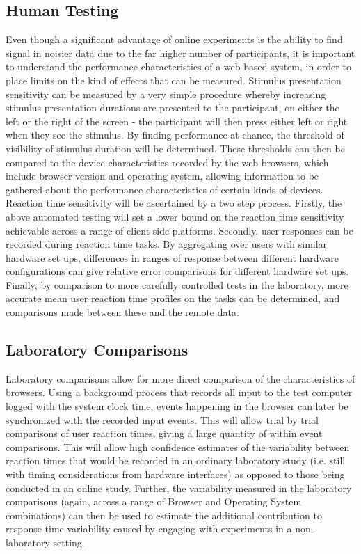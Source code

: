 \documentclass[12pt,a4paper,titlepage]{scrreprt}
\begin{document}
\subsection{Human Testing}
Even though a significant advantage of online experiments is the ability to find signal in noisier data due to the far higher number of participants\cite{birnbaum_web-based_2001}, it is important to understand the performance characteristics of a web based system, in order to place limits on the kind of effects that can be measured. 
Stimulus presentation sensitivity can be measured by a very simple procedure whereby increasing stimulus presentation durations are presented to the participant, on either the left or the right of the screen - the participant will then press either left or right when they see the stimulus. By finding performance at chance, the threshold of visibility of stimulus duration will be determined. These thresholds can then be compared to the device characteristics recorded by the web browsers, which include browser version and operating system, allowing information to be gathered about the performance characteristics of certain kinds of devices.
Reaction time sensitivity will be ascertained by a two step process. Firstly, the above automated testing will set a lower bound on the reaction time sensitivity achievable across a range of client side platforms. Secondly, user responses can be recorded during reaction time tasks. By aggregating over users with similar hardware set ups, differences in ranges of response between different hardware configurations can give relative error comparisons for different hardware set ups. Finally, by comparison to more carefully controlled tests in the laboratory, more accurate mean user reaction time profiles on the tasks can be determined, and comparisons made between these and the remote data.
\subsection{Laboratory Comparisons}
Laboratory comparisons allow for more direct comparison of the characteristics of browsers. Using a background process that records all input to the test computer logged with the system clock time, events happening in the browser can later be synchronized with the recorded input events. This will allow trial by trial comparisons of user reaction times, giving a large quantity of within event comparisons. This will allow high confidence estimates of the variability between reaction times that would be recorded in an ordinary laboratory study (i.e. still with timing considerations from hardware interfaces) as opposed to those being conducted in an online study. Further, the variability measured in the laboratory comparisons (again, across a range of Browser and Operating System combinations) can then be used to estimate the additional contribution to response time variability caused by engaging with experiments in a non-laboratory setting.
\end{document}
